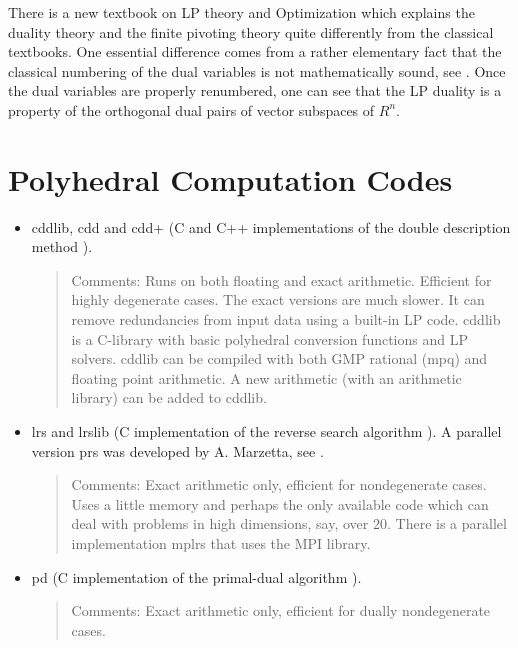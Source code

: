 \documentclass[[a4paper,12pt]{article}
\begin{document}
There is a new textbook on LP theory and Optimization \cite{f-io-20} which explains the duality
theory and the finite pivoting theory quite differently from the classical
textbooks.   One essential difference comes from a rather elementary fact
that the classical numbering of the dual
variables is not mathematically sound, see \cite[Chap 1--4]{f-io-20}.  Once
the dual variables are properly renumbered, one can see that the LP duality
 is a property of the orthogonal dual pairs of vector subspaces
of $R^n$.


\section{Polyhedral Computation Codes} \label{Sec:codes}
\begin{itemize}
\item cddlib, cdd  and cdd+ \cite{f-cddhome} 
(C and C++ implementations of the double description method \cite{mrtt-ddm-53}).
\begin{quote}
Comments: Runs on both floating and exact arithmetic.  Efficient for highly 
degenerate cases.  The exact
versions are much slower.   It can remove redundancies from input data
using a built-in LP code.  cddlib is a C-library with basic
polyhedral conversion functions and LP solvers.  cddlib can be
compiled with both GMP rational (mpq) and floating point arithmetic.
A new arithmetic (with an arithmetic library) can be added to cddlib.
\end{quote}

\item lrs and lrslib  \cite{a-lrshome-01} (C implementation of the reverse search algorithm 
\cite{af-pachv-92}).  A parallel version prs was developed by A. Marzetta,
see \cite{bmfn-psbza-96}.
\begin{quote}
Comments: Exact arithmetic only, efficient for nondegenerate cases.  Uses a little memory
and perhaps the only available code which can deal with problems in high dimensions, say, over $20$.  
There is a parallel implementation mplrs that uses the MPI library.
\end{quote}

\item pd  \cite{m-pdcip-97} (C implementation of the primal-dual algorithm 
\cite{bfm-pdmvf-97}). 
\begin{quote}
Comments: Exact arithmetic only, efficient for dually nondegenerate cases. 
\end{quote}


\end{itemize}
\end{document}
